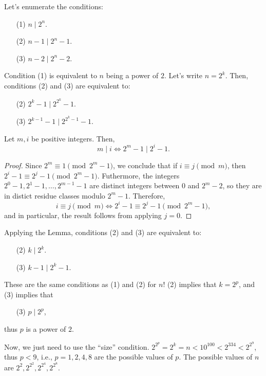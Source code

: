 \documentclass[11pt,a4paper]{article}
\begin{document}
	\newpage
	\begin{sol}
		Let's enumerate the conditions:
		\begin{enumerate}
			\item[(1)] \(n \mid 2^n\).
			\item[(2)] \(n - 1 \mid 2^n - 1\).
			\item[(3)] \(n - 2 \mid 2^n - 2\).
		\end{enumerate}

		Condition (1) is equivalent to \(n\) being a power of \(2\). Let's write \(n = 2^k\). Then, conditions (2) and (3) are equivalent to:
		\begin{enumerate}
			\item[(2)] \(2^k - 1 \mid 2^{2^k} - 1\).
			\item[(3)] \(2^{k-1} - 1 \mid 2^{2^k - 1} - 1\).
		\end{enumerate}

		\begin{lem}[Order]
			Let \(m, i\) be positive integers. Then, \[m \mid i \iff 2^m - 1 \mid 2^i - 1.\]
		\end{lem}
		\begin{proof}
		Since \(2^m \equiv 1 \pmod{2^m - 1}\), we conclude that if \(i \equiv j \pmod{m}\), then \(2^i - 1 \equiv 2^j - 1 \pmod{2^m - 1}\).
		Futhermore, the integers \(2^0 - 1, 2^1 - 1, \dots, 2^{m-1} - 1\) are distinct integers between \(0\) and \(2^m - 2\), so they are in distict residue classes modulo  \(2^m - 1\). Therefore, \[
			i \equiv j \pmod{m} \iff 2^i - 1 \equiv 2^j - 1 \pmod{2^m - 1},
		\]
		and in particular, the result follows from applying \(j = 0\).
		\end{proof}

		Applying the Lemma, conditions (2) and (3) are equivalent to:
		\begin{enumerate}
			\item[(2)] \(k \mid 2^k\).
			\item[(3)] \(k - 1 \mid 2^k - 1\).
		\end{enumerate}

		These are the same conditions as (1) and (2) for \(n\)! (2) implies that \(k = 2^p\), and (3) implies that
		\begin{enumerate}
			\item[(3)] \(p \mid 2^p\),
		\end{enumerate} 
		thus \(p\) is a power of \(2\).
		
		Now, we just need to use the ``size'' condition.  \(2^{2^p} = 2^k = n < 10^{100} < 2^{334} < 2^{2^{9}}\), thus \(p < 9\), i.e.,  \(p = 1, 2, 4, 8\) are the possible values of \(p\). The  possible values of \(n\) are \(2^2, 2^{2^2}, 2^{2^4}, 2^{2^8}\).
	\end{sol}
\end{document}

